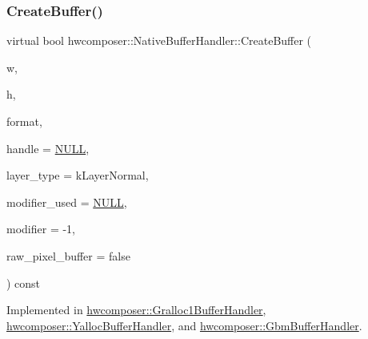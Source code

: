 \mbox{\label{classhwcomposer_1_1NativeBufferHandler_a7e58e3d81d3f56cbee34c963b4999fde}} 
\subsubsection{\texorpdfstring{Create\+Buffer()}{CreateBuffer()}}
{\footnotesize\ttfamily virtual bool hwcomposer\+::\+Native\+Buffer\+Handler\+::\+Create\+Buffer (\begin{DoxyParamCaption}\item[{uint32\+\_\+t}]{w,  }\item[{uint32\+\_\+t}]{h,  }\item[{int}]{format,  }\item[{\mbox{\hyperlink{alios_2platformdefines_8h_ac0a2eaf260f556d17fe489911f017bdf}{H\+W\+C\+Native\+Handle}} $\ast$}]{handle = {\ttfamily \mbox{\hyperlink{alios_2platformdefines_8h_a070d2ce7b6bb7e5c05602aa8c308d0c4}{N\+U\+LL}}},  }\item[{uint32\+\_\+t}]{layer\+\_\+type = {\ttfamily kLayerNormal},  }\item[{bool $\ast$}]{modifier\+\_\+used = {\ttfamily \mbox{\hyperlink{alios_2platformdefines_8h_a070d2ce7b6bb7e5c05602aa8c308d0c4}{N\+U\+LL}}},  }\item[{int64\+\_\+t}]{modifier = {\ttfamily -\/1},  }\item[{bool}]{raw\+\_\+pixel\+\_\+buffer = {\ttfamily false} }\end{DoxyParamCaption}) const\hspace{0.3cm}{\ttfamily [pure virtual]}}



Implemented in \mbox{\hyperlink{classhwcomposer_1_1Gralloc1BufferHandler_a980ee5c0aa77d99861a89bdf6294d2db}{hwcomposer\+::\+Gralloc1\+Buffer\+Handler}}, \mbox{\hyperlink{classhwcomposer_1_1YallocBufferHandler_a33d2042ab272653ebac4fcab8e957c8f}{hwcomposer\+::\+Yalloc\+Buffer\+Handler}}, and \mbox{\hyperlink{classhwcomposer_1_1GbmBufferHandler_adf982a610866df90e9a2ee4f04801387}{hwcomposer\+::\+Gbm\+Buffer\+Handler}}.

\mbox{\label{classhwcomposer_1_1NativeBufferHandler_a7cd90f5d6e7ba6a46758e7891168c332}} 
